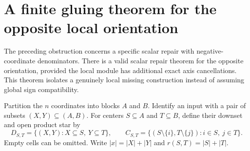 \documentclass[11pt]{article}
\begin{document}
\section{A finite gluing theorem for the opposite local orientation}

The preceding obstruction concerns a specific scalar repair with
negative-coordinate denominators. There is a valid scalar repair
theorem for the opposite orientation, provided the local module has
additional exact axis cancellations. This theorem isolates a genuinely
local missing construction instead of assuming global sign compatibility.

Partition the $n$ coordinates into blocks $A$ and $B$. Identify an
input with a pair of subsets $(X,Y)\subseteq(A,B)$. For centers
$S\subseteq A$ and $T\subseteq B$, define their downset and open
product star by
\[
 D_{S,T}=\{(X,Y):X\subseteq S,\ Y\subseteq T\},\qquad
 C_{S,T}=\{(S\setminus\{i\},T\setminus\{j\}):i\in S,\ j\in T\}.
\]
Empty cells can be omitted. Write $|x|=|X|+|Y|$ and
$r(S,T)=|S|+|T|$.
\end{document}
